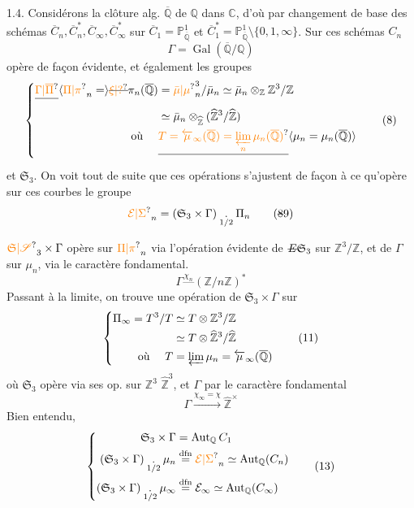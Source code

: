 1.4. Considérons la clôture alg. $\overline{\mathbb Q}$ de $\mathbb Q$ dans $\mathbb C$,
d'où par changement de base des
schémas $\overline C_n,\overline C_n^*,\overline C_\infty,\overline C_\infty^*$ sur $\overline C_1=\mathbb P^1_{\overline{\mathbb Q}}$
et $\overline C_1^*=\mathbb P^1_{\overline{\mathbb Q}}\setminus\{0,1,\infty\}$. Sur ces schémas $C_n$
\[
\Gamma=\operatorname{Gal}(\overline{\mathbb Q}/\mathbb Q)\tag*{(7)}
\]
opère de façon évidente, et également les
groupes
\[
\left\{\begin{aligned}
\deleted{\unsure{\Gamma|\overline{\Pi}}}\inserted{\unsure{\Pi|\pi}_n=}\deleted{\unsure{\xi|?}}\pi_n(\overline{\mathbb Q})&=
\unsure{\bar\mu|\mu}_n^3/\bar\mu_n\simeq\bar\mu_n\otimes_{\mathbb Z}\mathbb Z^3/\mathbb Z\\
&\simeq\bar\mu_n\otimes_{\widehat{\mathbb Z}}(\widehat{\mathbb Z}^{3}/\widehat{\mathbb Z})\\
\text{où }\quad &\deleted{\unsure{T=\overleftarrow{\mu}_\infty(\overline{\mathbb Q})=\varprojlim_n\mu_n(\overline{\mathbb Q})}}\inserted{\mu_n=\mu_n(\overline{\mathbb Q})}
\end{aligned}\right.\tag*{(8)}
\]
et $\mathfrak S_3$. On voit tout de suite que
ces opérations s'ajustent de façon à ce
qu'opère sur ces courbes le groupe
\[
\unsure{\mathcal E|\Sigma}_n=(\mathfrak S_3\times\Gamma)\underset{1/2}{\mathbin{.}}\Pi_n\tag*{(\deleted{8}9)}
\]

 $\unsure{\mathfrak S|\mathscr S}_3\times\Gamma$ opère sur $\unsure{\Pi|\pi}_n$ via l'opération
évidente de $\deleted{E}\mathfrak S_3$ sur $\mathbb Z^3/\mathbb Z$, et de $\Gamma$
sur $\mu_n$, via le caractère fondamental.
\[
\Gamma\mathrel{\overset{\chi_n}{\text{---}}}(\mathbb Z/n\mathbb Z)^*\tag*{(10)}
\]
Passant à la limite, on trouve une opération
de $\mathfrak S_3\times\Gamma$ sur
\[
\left\{\begin{aligned}
\Pi_\infty=T^3/T&\simeq T\otimes\mathbb Z^3/\mathbb Z\\
&\simeq T\otimes\widehat{\mathbb Z}^3/\widehat{\mathbb Z}\\
\text{où }\quad T&=\varprojlim\mu_n=\overleftarrow{\mu}_\infty(\overline{\mathbb Q})
\end{aligned}\right.\tag*{(11)}
\]
où $\mathfrak S_3$ opère via ses op. sur $\mathbb Z^3$  $\widehat{\mathbb Z}^3$,
et $\Gamma$ par le caractère fondamental
\[
\Gamma\xrightarrow{\chi_\infty=\chi}\widehat{\mathbb Z}^{\times}\tag*{(12)}
\]
Bien entendu,
\[
\left\{\begin{aligned}
\mathfrak S_3\times\Gamma&=\operatorname{Aut}_{\mathbb Q}C_1\\
(\mathfrak S_3\times\Gamma)\underset{1/2}{\mathbin{.}}\mu_n&\overset{\mathrm{dfn}}{=}\unsure{\mathcal E|\Sigma}_n\simeq\operatorname{Aut}_{\mathbb Q}(C_n)\\
(\mathfrak S_3\times\Gamma)\underset{1/2}{\mathbin{.}}\mu_\infty&\overset{\mathrm{dfn}}{=}\mathcal E_\infty\simeq\operatorname{Aut}_{\mathbb Q}(C_\infty)
\end{aligned}\right.\tag*{(13)}
\]

